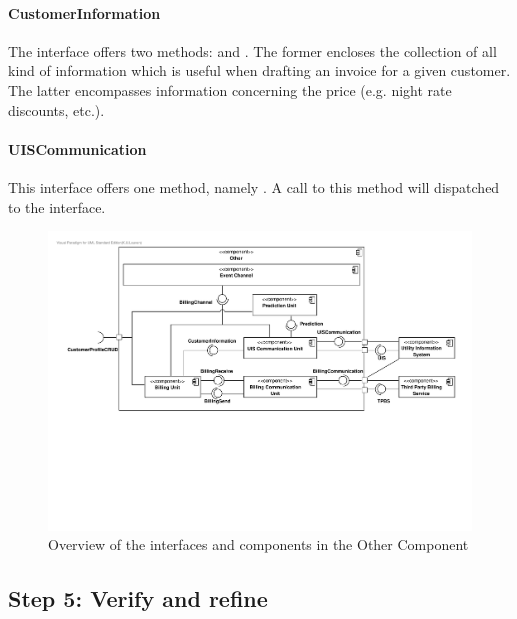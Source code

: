 \paragraph{CustomerInformation}

\npar The  interface offers two methods:
 and
. The former encloses the collection of all
kind of information which is useful when drafting an invoice for a given
customer. The latter encompasses information concerning the price (e.g.
night rate discounts, etc.).

\paragraph{UISCommunication}
\npar This interface offers one method, namely
. A call to this
method will dispatched to the  interface.

\begin{figure}[H]
	\begin{centering}
		\includegraphics[width=\textwidth]{figs/add-it9-interfaces.pdf}
		\caption{Overview of the interfaces and components in the Other Component}
		\label{fig:it9/interfaces}
	\end{centering}
\end{figure}

\subsection{Step 5: Verify and refine}
\label{add:it9/verification}

